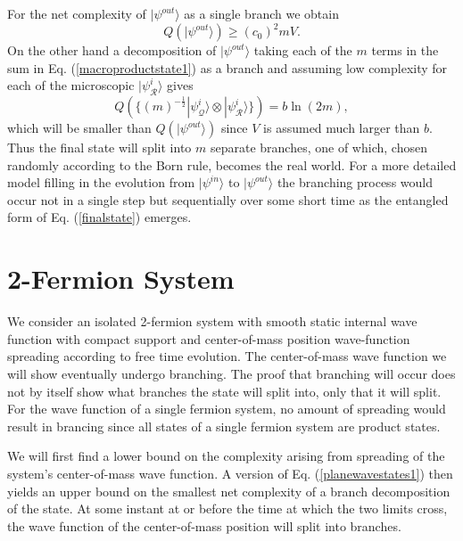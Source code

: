 \documentclass[twocolumn,amsmath,amssymb]{revtex4-1}
\begin{document}
For the net complexity of $|\psi^{out} \rangle $ as a single branch we obtain
\begin{equation}
\label{psioutQ}
Q( |\psi^{out} \rangle ) \ge (c_0)^2 m V.
\end{equation}
On the other hand a decomposition of $|\psi^{out} \rangle $ 
taking each of the $m$ terms in the sum in Eq. (\ref{macroproductstate1})
as a branch and assuming
low complexity for each of the microscopic $|\psi^i_{\mathcal{R}} \rangle $ gives
\begin{equation}
\label{psioutQ1}
Q( \{(m)^{-\frac{1}{2}}|\psi^i_{\mathcal{Q}} \rangle  \otimes |\psi^i_{\mathcal{R}} \rangle  \}) = b \ln( 2 m),
\end{equation}
which will be smaller than $Q( |\psi^{out} \rangle )$ since $V$ is assumed
much larger than $b$.
Thus the final state will split into $m$ separate branches, one of which, chosen randomly
according to the Born rule, becomes the real world. 
For a more detailed model filling in the evolution from $|\psi^{in} \rangle $ to $|\psi^{out} \rangle $
the branching process would occur not in a single step
but sequentially over some short time as the entangled form of Eq. (\ref{finalstate}) emerges.



\section{\label{sec:2particles} 2-Fermion System}

We consider
an isolated 2-fermion system with smooth static internal
wave function with compact support and 
center-of-mass position wave-function
spreading according to free time evolution.
The center-of-mass wave function we will show
eventually undergo branching. 
The proof that branching will occur
does not by itself show what branches the
state will split into, only that it will split.
For the wave function of a single fermion system,
no amount of spreading would result in brancing since
all states of a single fermion system are product states.

We will first find a lower bound on the complexity arising
from spreading of the system's center-of-mass wave function.
A version of Eq. (\ref{planewavestates1})
then yields an upper bound on the smallest net complexity of a branch decomposition of 
the state. At some instant at or before the time at which
the two limits cross,
the wave function of the center-of-mass position will split into branches.
\end{document}
